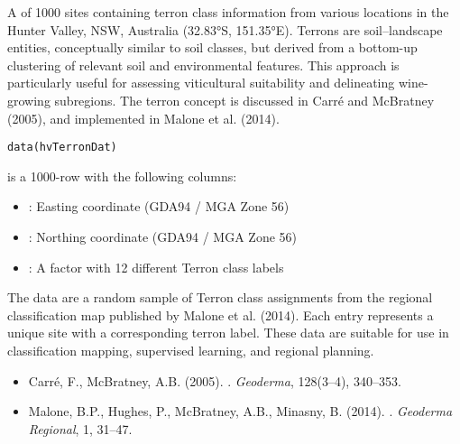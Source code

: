 \documentclass[a4paper]{book}
\begin{document}
%
\begin{Description}
A  of 1000 sites containing terron class information from various locations in the Hunter Valley, NSW, Australia (32.83°S, 151.35°E). Terrons are soil–landscape entities, conceptually similar to soil classes, but derived from a bottom-up clustering of relevant soil and environmental features. This approach is particularly useful for assessing viticultural suitability and delineating wine-growing subregions. The terron concept is discussed in Carré and McBratney (2005), and implemented in Malone et al. (2014).
\end{Description}
%
\begin{Usage}
\begin{verbatim}
data(hvTerronDat)
\end{verbatim}
\end{Usage}
%
\begin{Format}
 is a 1000-row  with the following columns:
\begin{itemize}

\item{} : Easting coordinate (GDA94 / MGA Zone 56)
\item{} : Northing coordinate (GDA94 / MGA Zone 56)
\item{} : A factor with 12 different Terron class labels

\end{itemize}

\end{Format}
%
\begin{Details}
The data are a random sample of Terron class assignments from the regional classification map published by Malone et al. (2014). Each entry represents a unique site with a corresponding terron label. These data are suitable for use in classification mapping, supervised learning, and regional planning.
\end{Details}
%
\begin{References}
\begin{itemize}

\item{} Carré, F., McBratney, A.B. (2005). . \emph{Geoderma}, 128(3–4), 340–353.
\item{} Malone, B.P., Hughes, P., McBratney, A.B., Minasny, B. (2014). . \emph{Geoderma Regional}, 1, 31–47.

\end{itemize}

\end{References}
\end{document}
